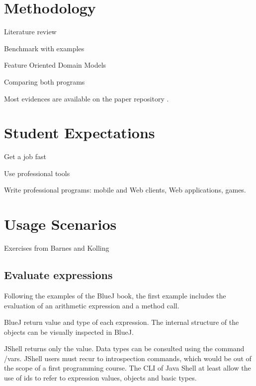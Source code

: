 \documentclass{article}
\begin{document}



\section{Methodology}

Literature review

Benchmark with examples

Feature Oriented Domain Models

Comparing both programs


Most evidences are available on the paper repository \cite{mangan2025codepadjshell}.

\section{Student Expectations}

Get a job fast

Use professional tools

Write professional programs: mobile and Web clients, Web applications, games.

\section{Usage Scenarios}

Exercises from Barnes and Kolling

\subsection{Evaluate expressions}

Following the examples of the BlueJ book, the first example includes the evaluation of an arithmetic expression and a method call.

BlueJ return value and type of each expression. 
The internal structure of the objects can be visually inspected in BlueJ. 

JShell returns only the value. Data types can be consulted using the command /vars.
JShell users must recur to introspection commands, which would be out of the scope of a first programming course. 
The CLI of Java Shell at least allow the use of ids to refer to expression values,  objects  and basic types.
\end{document}
